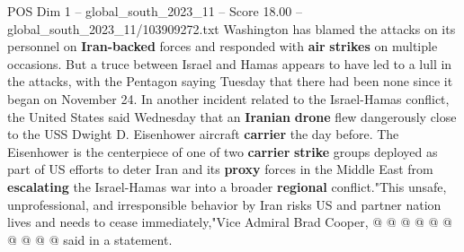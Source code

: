 \begin{textsample}{POS Dim 1 – global\_south\_2023\_11 – Score 18.00 – global\_south\_2023\_11/103909272.txt}
Washington has blamed the attacks on its personnel on \textbf{Iran-backed} forces and responded with \textbf{air} \textbf{strikes} on multiple occasions.
But a truce between Israel and Hamas appears to have led to a lull in the attacks, with the Pentagon saying Tuesday that there had been none since it began on November 24.
In another incident related to the Israel-Hamas conflict, the United States said Wednesday that an \textbf{Iranian} \textbf{drone} flew dangerously close to the USS Dwight D.
Eisenhower aircraft \textbf{carrier} the day before.
The Eisenhower is the centerpiece of one of two \textbf{carrier} \textbf{strike} groups deployed as part of US efforts to deter Iran and its \textbf{proxy} forces in the Middle East from \textbf{escalating} the Israel-Hamas war into a broader \textbf{regional} conflict."This unsafe, unprofessional, and irresponsible behavior by Iran risks US and partner nation lives and needs to cease immediately,"Vice Admiral Brad Cooper, @ @ @ @ @ @ @ @ @ @ said in a statement.

\end{textsample}
